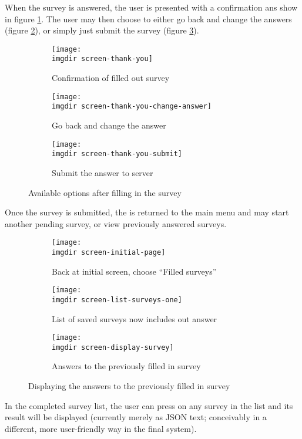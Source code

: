 When the survey is answered, the user is presented with a confirmation ans show in figure \ref{fig:screen-thank-you}. The user may then choose to either go back and change the answers (figure \ref{fig:screen-thank-you-change-answer}), or simply just submit the survey (figure \ref{fig:screen-thank-you-submit}).

\begin{figure}[!htbp]
  \centering
  \begin{subfigure}{.3\textwidth}
    \centering
    \texttt{[image: \\imgdir screen-thank-you]}
    \caption{Confirmation of filled out survey}
    \label{fig:screen-thank-you}
  \end{subfigure}
  \begin{subfigure}{.3\textwidth}
    \centering
    \texttt{[image: \\imgdir screen-thank-you-change-answer]}
    \caption{Go back and change the answer}
    \label{fig:screen-thank-you-change-answer}
  \end{subfigure}
  \begin{subfigure}{.3\textwidth}
    \centering
    \texttt{[image: \\imgdir screen-thank-you-submit]}
    \caption{Submit the answer to server}
    \label{fig:screen-thank-you-submit}
  \end{subfigure}
  \caption{Available options after filling in the survey}
  \label{fig:screen-post-survey-action}
\end{figure}

Once the survey is submitted, the is returned to the main menu and may start another pending survey, or view previously answered surveys.
\newpage

\begin{figure}[!htbp]
  \centering
  \begin{subfigure}{.3\textwidth}
    \centering
    \texttt{[image: \\imgdir screen-initial-page]}
    \caption{Back at initial screen, choose ``Filled surveys''}
    \label{fig:screen-initial-page-again}
  \end{subfigure}
  \begin{subfigure}{.3\textwidth}
    \centering
    \texttt{[image: \\imgdir screen-list-surveys-one]}
    \caption{List of saved surveys now includes out answer}
    \label{fig:screen-list-surveys-one}
  \end{subfigure}
  \begin{subfigure}{.3\textwidth}
    \centering
    \texttt{[image: \\imgdir screen-display-survey]}
    \caption{Answers to the previously filled in survey}
    \label{fig:screen-display-survey}
  \end{subfigure}
  \caption{Displaying the answers to the previously filled in survey}
  \label{fig:screen-display-filled-in-survey}
\end{figure}

In the completed survey list, the user can press on any survey in the list and its result will be displayed (currently merely as JSON text; conceivably in a different, more user-friendly way in the final system).